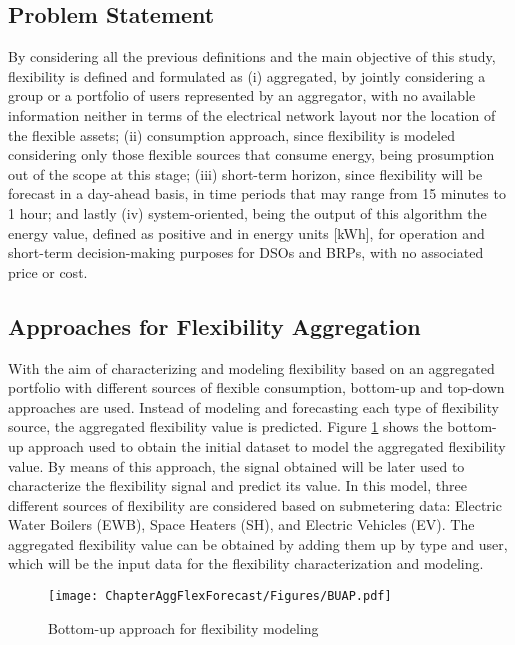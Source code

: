 \subsection{Problem Statement} \label{sec:problemstatement}
By considering all the previous definitions and the main objective of this study, flexibility is defined and formulated as (i) aggregated, by jointly considering a group or a portfolio of users represented by an aggregator, with no available information neither in terms of the electrical network layout nor the location of the flexible assets; (ii) consumption approach, since flexibility is modeled considering only those flexible sources that consume energy, being prosumption out of the scope at this stage; (iii) short-term horizon, since flexibility will be forecast in a day-ahead basis, in time periods that may range from 15 minutes to 1 hour; and lastly (iv) system-oriented, being the output of this algorithm the energy value, defined as positive and in energy units [kWh], for operation and short-term decision-making purposes for DSOs and BRPs, with no associated price or cost. 

\subsection{Approaches for Flexibility Aggregation}
With the aim of characterizing and modeling flexibility based on an aggregated portfolio with different sources of flexible consumption, bottom-up and top-down approaches are used. Instead of modeling and forecasting each type of flexibility source, the aggregated flexibility value is predicted. Figure \ref{fig:bottom_up} shows the bottom-up approach used to obtain the initial dataset to model the aggregated flexibility value. By means of this approach, the signal obtained will be later used to characterize the flexibility signal and predict its value. In this model, three different sources of flexibility are considered based on submetering data: Electric Water Boilers (EWB), Space Heaters (SH), and Electric Vehicles (EV). The aggregated flexibility value can be obtained by adding them up by type and user, which will be the input data for the flexibility characterization and modeling.

\begin{figure}[]
\centerline{\texttt{[image: ChapterAggFlexForecast/Figures/BUAP.pdf]}}
\caption{Bottom-up approach for flexibility modeling}
\label{fig:bottom_up}
\end{figure}


